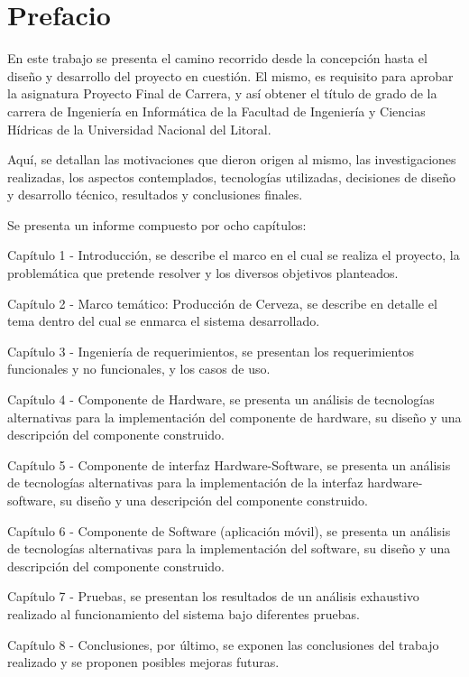 \chapter{Prefacio}
\par
En este trabajo se presenta el camino recorrido desde la concepción hasta el diseño y desarrollo del proyecto en cuestión. El mismo, es requisito para aprobar la asignatura Proyecto Final de Carrera, y así obtener el título de grado de la carrera de Ingeniería en Informática de la Facultad de Ingeniería y Ciencias Hídricas de la Universidad Nacional del Litoral.
\par
Aquí, se detallan las motivaciones que dieron origen al mismo, las investigaciones realizadas, los aspectos contemplados, tecnologías utilizadas, decisiones de diseño y desarrollo técnico, resultados y conclusiones finales.
\par
Se presenta un informe compuesto por ocho capítulos:
\par
Capítulo 1 - Introducción, se describe el marco en el cual se realiza el proyecto, la problemática que pretende resolver y los diversos objetivos planteados.
\par
Capítulo 2 - Marco temático: Producción de Cerveza, se describe en detalle el tema dentro del cual se enmarca el sistema desarrollado.
\par
Capítulo 3 - Ingeniería de requerimientos, se presentan los requerimientos funcionales y no funcionales, y los casos de uso.
\par
Capítulo 4 - Componente de Hardware, se presenta un análisis de tecnologías alternativas para la implementación del componente de hardware, su diseño y una descripción del componente construido.
\par
Capítulo 5 - Componente de interfaz Hardware-Software, se presenta un análisis de tecnologías alternativas para la implementación de la interfaz hardware-software, su diseño y una descripción del componente construido.
\par
Capítulo 6 - Componente de Software (aplicación móvil), se presenta un análisis de tecnologías alternativas para la implementación del software, su diseño y una descripción del componente construido.
\par
Capítulo 7 - Pruebas, se presentan los resultados de un análisis exhaustivo realizado al funcionamiento del sistema bajo diferentes pruebas.
\par
Capítulo 8 - Conclusiones, por último, se exponen las conclusiones del trabajo realizado y se proponen posibles mejoras futuras.
